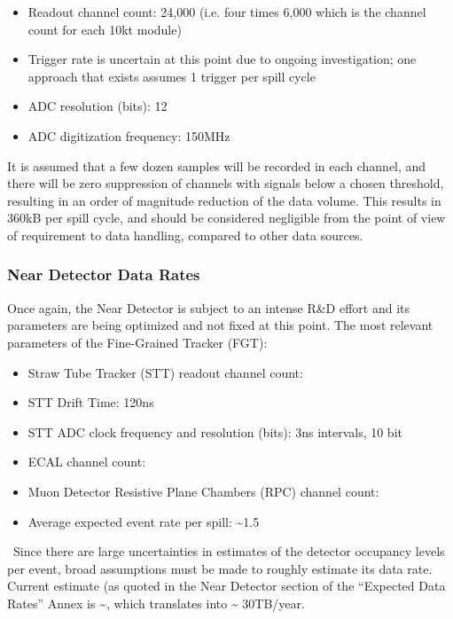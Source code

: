 \begin{itemize}
\item Readout channel count: 24,000 (i.e. four times 6,000 which is the channel count for each 10kt module)
\item Trigger rate is uncertain at this point due to ongoing investigation; one approach that exists assumes 1 trigger per spill cycle
\item ADC resolution (bits): 12
\item ADC digitization frequency: 150MHz
\end{itemize}
It is assumed that a few dozen samples will be recorded in each
channel, and there will be zero suppression of channels with signals
below a chosen threshold, resulting in an order of magnitude reduction
of the data volume.  This results in 360kB per spill cycle, and should
be considered negligible from the point of view of requirement to data
handling, compared to other data sources.

\subsubsection{Near Detector Data Rates}
Once again, the Near Detector is subject to an intense R\&D effort and
its parameters are being optimized and not fixed at this point. The
most relevant parameters of the Fine-Grained Tracker (FGT):
\begin{itemize}
\item   Straw Tube Tracker (STT) readout channel count: \ndsstchannels
\item STT Drift Time: 120ns
\item STT ADC clock frequency and resolution (bits): 3ns intervals, 10 bit
\item ECAL channel count: \ndecalchannels
\item Muon Detector Resistive Plane Chambers (RPC) channel count: \ndmuidchannels
\item Average expected event rate per spill: \textasciitilde 1.5
\end{itemize}
\ Since there are large uncertainties in estimates of the detector
occupancy levels per event, broad assumptions must be made to roughly
estimate its data rate. Current estimate (as quoted in the Near
Detector section of the ``Expected Data Rates'' Annex is
\textasciitilde \nddatarate, which translates into \textasciitilde
30TB/year.


